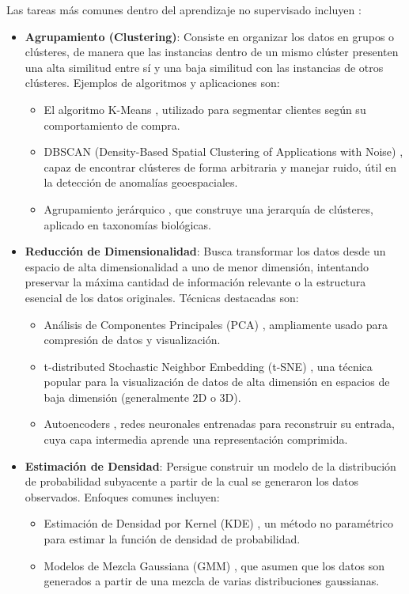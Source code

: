 Las tareas más comunes dentro del aprendizaje no supervisado incluyen \citep{Bishop2006, James2013}:
\begin{itemize}
    \item \textbf{Agrupamiento (Clustering)}: Consiste en organizar los datos en grupos o clústeres, de manera que las instancias dentro de un mismo clúster presenten una alta similitud entre sí y una baja similitud con las instancias de otros clústeres.
    Ejemplos de algoritmos y aplicaciones son:
    \begin{itemize}
        \item El algoritmo K-Means \citep{MacQueen1967, Lloyd1982}, utilizado para segmentar clientes según su comportamiento de compra.
        \item DBSCAN (Density-Based Spatial Clustering of Applications with Noise) \citep{Ester1996}, capaz de encontrar clústeres de forma arbitraria y manejar ruido, útil en la detección de anomalías geoespaciales.
        \item Agrupamiento jerárquico \citep{Johnson1967}, que construye una jerarquía de clústeres, aplicado en taxonomías biológicas.
    \end{itemize}

    \item \textbf{Reducción de Dimensionalidad}: Busca transformar los datos desde un espacio de alta dimensionalidad a uno de menor dimensión, intentando preservar la máxima cantidad de información relevante o la estructura esencial de los datos originales.
    Técnicas destacadas son:
    \begin{itemize}
        \item Análisis de Componentes Principales (PCA) \citep{Pearson1901, Hotelling1933}, ampliamente usado para compresión de datos y visualización.
        \item t-distributed Stochastic Neighbor Embedding (t-SNE) \citep{vanderMaaten2008}, una técnica popular para la visualización de datos de alta dimensión en espacios de baja dimensión (generalmente 2D o 3D).
        \item Autoencoders \citep{Hinton1987autoencoders, Bengio2009learning}, redes neuronales entrenadas para reconstruir su entrada, cuya capa intermedia aprende una representación comprimida.
    \end{itemize}

    \item \textbf{Estimación de Densidad}: Persigue construir un modelo de la distribución de probabilidad subyacente a partir de la cual se generaron los datos observados.
    Enfoques comunes incluyen:
    \begin{itemize}
        \item Estimación de Densidad por Kernel (KDE) \citep{Parzen1962, Rosenblatt1956}, un método no paramétrico para estimar la función de densidad de probabilidad.
        \item Modelos de Mezcla Gaussiana (GMM) \citep{Dempster1977}, que asumen que los datos son generados a partir de una mezcla de varias distribuciones gaussianas.
    \end{itemize}
\end{itemize}


